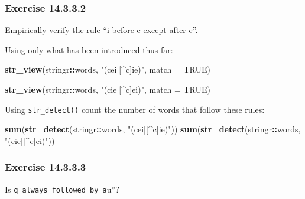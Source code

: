 \documentclass[]{book}
\newenvironment{Shaded}{\begin{snugshade}}{\end{snugshade}}
\newcommand{\DataTypeTok}[1]{\textcolor[rgb]{0.13,0.29,0.53}{#1}}
\newcommand{\KeywordTok}[1]{\textcolor[rgb]{0.13,0.29,0.53}{\textbf{#1}}}
\newcommand{\NormalTok}[1]{#1}
\newcommand{\OperatorTok}[1]{\textcolor[rgb]{0.81,0.36,0.00}{\textbf{#1}}}
\newcommand{\OtherTok}[1]{\textcolor[rgb]{0.56,0.35,0.01}{#1}}
\newcommand{\StringTok}[1]{\textcolor[rgb]{0.31,0.60,0.02}{#1}}
\theoremstyle{plain}
\theoremstyle{remark}
\theoremstyle{definition}
\theoremstyle{definition}
\theoremstyle{definition}
\theoremstyle{remark}
\begin{document}
\hypertarget{exercise-14.3.3.2}{%
\subsubsection*{\texorpdfstring{Exercise
{14.3.3.2}}{Exercise 14.3.3.2}}\label{exercise-14.3.3.2}}

Empirically verify the rule ``i before e except after c''.

Using only what has been introduced thus far:

\begin{Shaded}
\begin{Highlighting}[]
\KeywordTok{str_view}\NormalTok{(stringr}\OperatorTok{::}\NormalTok{words, }\StringTok{"(cei|[^c]ie)"}\NormalTok{, }\DataTypeTok{match =} \OtherTok{TRUE}\NormalTok{)}
\end{Highlighting}
\end{Shaded}

\begin{Shaded}
\begin{Highlighting}[]
\KeywordTok{str_view}\NormalTok{(stringr}\OperatorTok{::}\NormalTok{words, }\StringTok{"(cie|[^c]ei)"}\NormalTok{, }\DataTypeTok{match =} \OtherTok{TRUE}\NormalTok{)}
\end{Highlighting}
\end{Shaded}

Using \texttt{str\_detect()} count the number of words that follow these
rules:

\begin{Shaded}
\begin{Highlighting}[]
\KeywordTok{sum}\NormalTok{(}\KeywordTok{str_detect}\NormalTok{(stringr}\OperatorTok{::}\NormalTok{words, }\StringTok{"(cei|[^c]ie)"}\NormalTok{))}
\KeywordTok{sum}\NormalTok{(}\KeywordTok{str_detect}\NormalTok{(stringr}\OperatorTok{::}\NormalTok{words, }\StringTok{"(cie|[^c]ei)"}\NormalTok{))}
\end{Highlighting}
\end{Shaded}

\hypertarget{exercise-14.3.3.3}{%
\subsubsection*{\texorpdfstring{Exercise
{14.3.3.3}}{Exercise 14.3.3.3}}\label{exercise-14.3.3.3}}

Is
\texttt{q\textquotesingle{}\textquotesingle{}\ always\ followed\ by\ a}u''?
\end{document}
